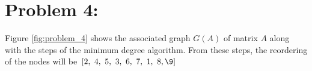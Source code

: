 \newpage
\section*{Problem 4:}

Figure \ref{fig:problem_4} shows the associated graph $G(A)$ of matrix $A$ along with the steps of the minimum degree algorithm. From these steps, the reordering of the nodes will be $[2,\ 4,\ 5,\ 3,\ 6,\ 7,\ 1,\ 8, \9]$



\begin{figure}[!tbh]
\centering        
    
   

\end{figure}
